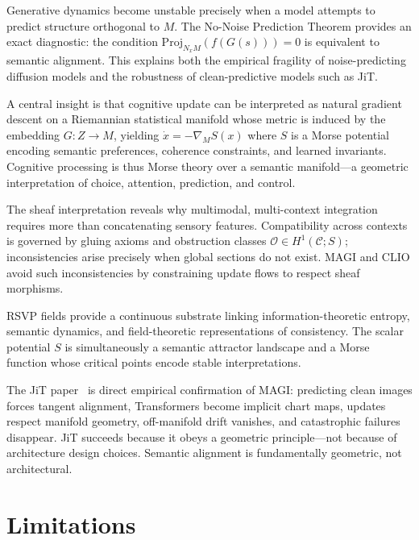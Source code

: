 \documentclass[11pt,a4paper,twocolumn]{article}
\begin{document}
Generative dynamics become unstable precisely when a model attempts to
predict structure orthogonal to $M$. The No-Noise Prediction Theorem
provides an exact diagnostic: the condition
$\mathrm{Proj}_{N_x M}(f(G(s))) = 0$ is equivalent to semantic
alignment. This explains both the empirical fragility of
noise-predicting diffusion models and the robustness of clean-predictive
models such as JiT.

A central insight is that cognitive update can be interpreted as natural
gradient descent on a Riemannian statistical manifold whose metric is
induced by the embedding $G : Z \to M$, yielding
$\dot{x} = -\nabla_M S(x)$ where $S$ is a Morse potential encoding
semantic preferences, coherence constraints, and learned invariants.
Cognitive processing is thus Morse theory over a semantic
manifold---a geometric interpretation of choice, attention, prediction,
and control.

The sheaf interpretation reveals why multimodal, multi-context
integration requires more than concatenating sensory features.
Compatibility across contexts is governed by gluing axioms and
obstruction classes $\mathcal{O} \in H^1(\mathcal{C}; S)$;
inconsistencies arise precisely when global sections do not exist.
MAGI and CLIO avoid such inconsistencies by constraining update flows
to respect sheaf morphisms.

RSVP fields provide a continuous substrate linking information-theoretic
entropy, semantic dynamics, and field-theoretic representations of
consistency. The scalar potential $S$ is simultaneously a semantic
attractor landscape and a Morse function whose critical points encode
stable interpretations.

The JiT paper~\cite{li2025backtobasics} is direct empirical confirmation
of MAGI: predicting clean images forces tangent alignment, Transformers
become implicit chart maps, updates respect manifold geometry,
off-manifold drift vanishes, and catastrophic failures disappear. JiT
succeeds because it obeys a geometric principle---not because of
architecture design choices. Semantic alignment is fundamentally
geometric, not architectural.


\section{Limitations}
\end{document}
